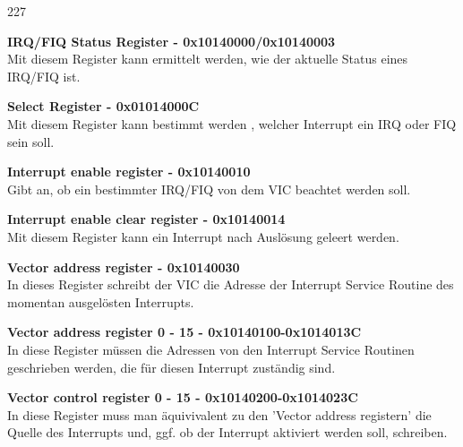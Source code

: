 \begin{dinglist}{227}
	\item{\textbf{IRQ/FIQ Status Register - 0x10140000/0x10140003}}\\
	Mit diesem Register kann ermittelt werden, wie der aktuelle Status eines IRQ/FIQ ist.
	\item{\textbf{Select Register - 0x01014000C}} \\
	Mit diesem Register kann bestimmt werden , welcher Interrupt ein IRQ oder FIQ sein soll.
	\item{\textbf{Interrupt enable register - 0x10140010}} \\
	Gibt an, ob ein bestimmter IRQ/FIQ von dem VIC beachtet werden soll.
	\item{\textbf{Interrupt enable clear register - 0x10140014}}\\
	Mit diesem Register kann ein Interrupt nach Ausl\"osung geleert werden.
	\item{\textbf{Vector address register - 0x10140030}}\\
	In dieses Register schreibt der VIC die Adresse der Interrupt Service Routine des momentan ausgel\"osten Interrupts.
	\item{\textbf{Vector address register 0 - 15 - 0x10140100-0x1014013C}}\\
	In diese Register m\"ussen die Adressen von den Interrupt Service Routinen geschrieben werden, die f\"ur diesen Interrupt zust\"andig sind.
	\item{\textbf{Vector control register 0 - 15 - 0x10140200-0x1014023C}}\\
	In diese Register muss man \"aquivivalent zu den 'Vector address registern' die Quelle des Interrupts und, ggf. ob der Interrupt aktiviert werden soll, schreiben.
\end{dinglist}